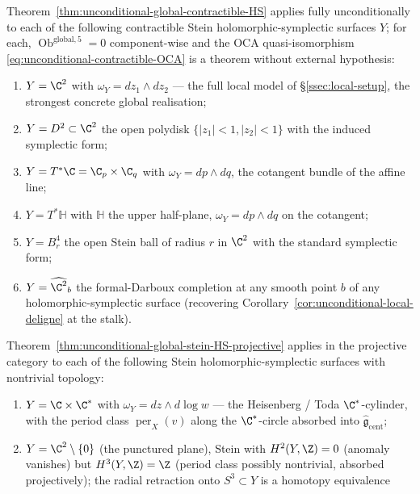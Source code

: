 \begin{cor}
\label{cor:concrete-global-realizations}
Theorem~\ref{thm:unconditional-global-contractible-HS} applies fully
unconditionally to each of the following contractible Stein
holomorphic-symplectic surfaces \(Y\); for each,
\(\operatorname{Ob}^{\mathrm{global,5}}=0\) component-wise and the
OCA quasi-isomorphism \eqref{eq:unconditional-contractible-OCA} is a
theorem without external hypothesis:
\begin{enumerate}[label=\textup{(\arabic*)}]
  \item \(Y=\C^2\) with \(\omega_Y=dz_1\wedge dz_2\) --- the full
        local model of \S\ref{ssec:local-setup}, the strongest concrete
        global realisation;
  \item \(Y=D^2\subset\C^2\) the open polydisk
        \(\{|z_1|<1,|z_2|<1\}\) with the induced symplectic form;
  \item \(Y=T^*\C=\C_p\times\C_q\) with \(\omega_Y=dp\wedge dq\),
        the cotangent bundle of the affine line;
  \item \(Y=T^*\mathbb H\) with \(\mathbb H\) the upper half-plane,
        \(\omega_Y=dp\wedge dq\) on the cotangent;
  \item \(Y=B_r^4\) the open Stein ball of radius \(r\) in \(\C^2\)
        with the standard symplectic form;
  \item \(Y=\widehat{\C^2}_{b}\) the formal-Darboux completion at any
        smooth point \(b\) of any holomorphic-symplectic surface
        (recovering Corollary~\ref{cor:unconditional-local-deligne}
        at the stalk).
\end{enumerate}
Theorem~\ref{thm:unconditional-global-stein-HS-projective} applies
in the projective category to each of the following Stein
holomorphic-symplectic surfaces with nontrivial topology:
\begin{enumerate}[label=\textup{(\arabic*)},resume]
  \item \(Y=\C\times\C^*\) with \(\omega_Y=dz\wedge d\log w\) --- the
        Heisenberg / Toda \(\C^*\)-cylinder, with the period class
        \(\operatorname{per}_X(v)\) along the \(\C^*\)-circle absorbed
        into \(\widehat{\mathfrak g}_{\mathrm{cent}}\);
  \item \(Y=\C^2\setminus\{0\}\) (the punctured plane), Stein with
        \(H^2(Y,\Z)=0\) (anomaly vanishes) but \(H^3(Y,\Z)=\Z\) (period
        class possibly nontrivial, absorbed projectively); the radial
        retraction onto \(S^3\subset Y\) is a homotopy equivalence

\end{enumerate}
\end{cor}
